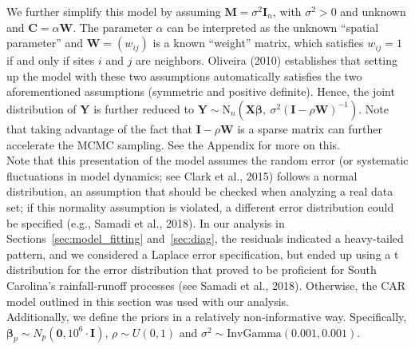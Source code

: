 We further simplify this model by assuming $\mathbf M = \sigma^2 \mathbf I_n$, with $ \sigma^2 > 0$  and unknown and $\mathbf C = \alpha \mathbf W$.
The parameter $ \alpha$ can be interpreted as the unknown ``spatial parameter'' and $\mathbf W = (w_{ij})$ is a known ``weight'' matrix, which satisfies $ w_{ij} =1$ if and only if sites $ i$ and $ j$ are neighbors. Oliveira (2010) establishes  that setting up the model with these two assumptions automatically satisfies the two aforementioned assumptions (symmetric and positive definite). Hence, the joint distribution of $ \mathbf Y$ is further reduced to $ \mathbf Y \sim \text{N}_n(\mathbf  X\boldsymbol{\beta} , \ \sigma^2 (\mathbf I -  \rho \mathbf W)^{-1})$.
Note that taking advantage of the fact that $ \mathbf I - \rho \mathbf W$ is a sparse matrix can further accelerate the MCMC sampling.
See the Appendix for more on this.\\


Note that this presentation of the model assumes the random error (or systematic fluctuations in model dynamics;
see Clark et al., 2015)  follows a normal distribution, an assumption that should be checked when analyzing a real data set;
if this normality assumption is violated, a different error distribution could be specified (e.g., Samadi et al., 2018).
  In our analysis in Sections~\ref{sec:model_fitting} and~\ref{sec:diag}, the residuals indicated a heavy-tailed pattern, and we considered a Laplace error specification, but ended up using a t distribution for the error distribution that proved to be proficient for South Carolina's rainfall-runoff processes (see Samadi et al., 2018).
   Otherwise, the CAR model outlined in this section was used with our analysis.\\

Additionally, we define the priors in a relatively non-informative way. Specifically,   $ \boldsymbol{\beta}_p \sim N_p(\mathbf 0, 10^6\cdot \mathbf  I)$, $ \rho \sim U(0, 1)$ and $ \sigma^2 \sim \text{InvGamma}(0.001, 0.001)$.